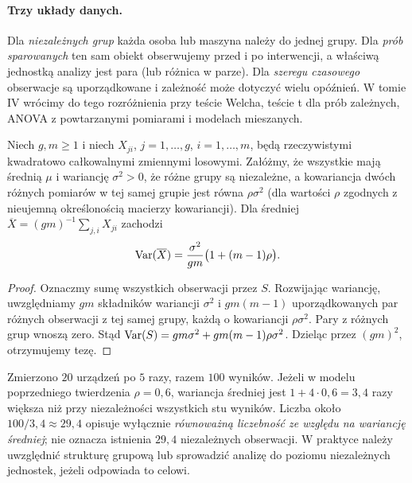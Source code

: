\paragraph{Trzy układy danych.}
Dla \emph{niezależnych grup} każda osoba lub maszyna należy do jednej grupy. Dla \emph{prób sparowanych} ten sam obiekt obserwujemy przed i po interwencji, a właściwą jednostką analizy jest para (lub różnica w parze). Dla \emph{szeregu czasowego} obserwacje są uporządkowane i zależność może dotyczyć wielu opóźnień. W tomie IV wrócimy do tego rozróżnienia przy teście Welcha, teście t dla prób zależnych, ANOVA z powtarzanymi pomiarami i modelach mieszanych.


\begin{twierdzenie}\label{thm:cluster-design}
Niech $g,m\ge1$ i niech $X_{ji}$, $j=1,\ldots,g$, $i=1,\ldots,m$,
będą rzeczywistymi kwadratowo całkowalnymi zmiennymi losowymi.
Załóżmy, że wszystkie mają średnią $\mu$ i wariancję $\sigma^2>0$,
że różne grupy są niezależne, a kowariancja dwóch różnych pomiarów
w tej samej grupie jest równa $\rho\sigma^2$ (dla wartości $\rho$
zgodnych z nieujemną określonością macierzy kowariancji).
Dla średniej $\overline X=(gm)^{-1}\sum_{j,i}X_{ji}$ zachodzi
\[
\operatorname{Var}(\overline X)=\frac{\sigma^2}{gm}\bigl(1+(m-1)\rho\bigr).
\]
\end{twierdzenie}
\begin{proof}
Oznaczmy sumę wszystkich obserwacji przez $S$. Rozwijając wariancję,
uwzględniamy $gm$ składników wariancji $\sigma^2$ i
$gm(m-1)$ uporządkowanych par różnych obserwacji z tej samej grupy,
każdą o kowariancji $\rho\sigma^2$. Pary z różnych grup wnoszą zero.
Stąd $\operatorname{Var}(S)=gm\sigma^2+gm(m-1)\rho\sigma^2$.
Dzieląc przez $(gm)^2$, otrzymujemy tezę.
\end{proof}
\begin{przyklad}
Zmierzono $20$ urządzeń po $5$ razy, razem $100$ wyników.
Jeżeli w modelu poprzedniego twierdzenia $\rho=0{,}6$, wariancja
średniej jest $1+4\cdot0{,}6=3{,}4$ razy większa niż przy
niezależności wszystkich stu wyników. Liczba około $100/3{,}4\approx29{,}4$
opisuje wyłącznie \emph{równoważną liczebność ze względu na wariancję
średniej}; nie oznacza istnienia $29{,}4$ niezależnych obserwacji.
W praktyce należy uwzględnić strukturę grupową lub sprowadzić
analizę do poziomu niezależnych jednostek, jeżeli odpowiada to celowi.
\end{przyklad}

